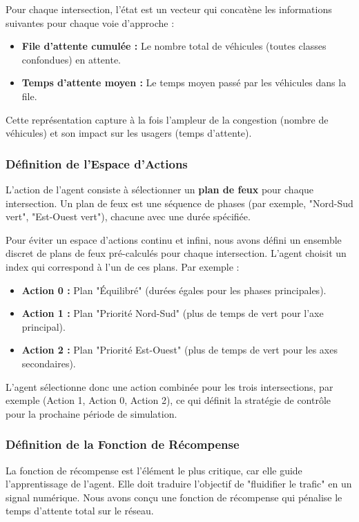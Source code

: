 Pour chaque intersection, l'état est un vecteur qui concatène les informations suivantes pour chaque voie d'approche :
\begin{itemize}
    \item \textbf{File d'attente cumulée :} Le nombre total de véhicules (toutes classes confondues) en attente.
    \item \textbf{Temps d'attente moyen :} Le temps moyen passé par les véhicules dans la file.
\end{itemize}
Cette représentation capture à la fois l'ampleur de la congestion (nombre de véhicules) et son impact sur les usagers (temps d'attente).

\subsubsection{Définition de l'Espace d'Actions}
\label{sec:action_space}

L'action de l'agent consiste à sélectionner un \textbf{plan de feux} pour chaque intersection. Un plan de feux est une séquence de phases (par exemple, "Nord-Sud vert", "Est-Ouest vert"), chacune avec une durée spécifiée.

Pour éviter un espace d'actions continu et infini, nous avons défini un ensemble discret de plans de feux pré-calculés pour chaque intersection. L'agent choisit un index qui correspond à l'un de ces plans. Par exemple :
\begin{itemize}
    \item \textbf{Action 0 :} Plan "Équilibré" (durées égales pour les phases principales).
    \item \textbf{Action 1 :} Plan "Priorité Nord-Sud" (plus de temps de vert pour l'axe principal).
    \item \textbf{Action 2 :} Plan "Priorité Est-Ouest" (plus de temps de vert pour les axes secondaires).
\end{itemize}
L'agent sélectionne donc une action combinée pour les trois intersections, par exemple (Action 1, Action 0, Action 2), ce qui définit la stratégie de contrôle pour la prochaine période de simulation.

\subsubsection{Définition de la Fonction de Récompense}
\label{sec:reward_function}

La fonction de récompense est l'élément le plus critique, car elle guide l'apprentissage de l'agent. Elle doit traduire l'objectif de "fluidifier le trafic" en un signal numérique. Nous avons conçu une fonction de récompense qui pénalise le temps d'attente total sur le réseau.

